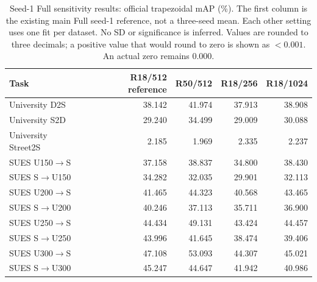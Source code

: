 \begin{table}[!t]
\centering
\caption{Seed-1 Full sensitivity results: official trapezoidal mAP (\%). The first column is the existing main Full seed-1 reference, not a three-seed mean. Each other setting uses one fit per dataset. No SD or significance is inferred. Values are rounded to three decimals; a positive value that would round to zero is shown as $<0.001$. An actual zero remains 0.000.}
\label{tab:sensitivity-map}
\small
\setlength{\tabcolsep}{3pt}
\begin{tabular}{lrrrr}
\toprule
Task & R18/512 reference & R50/512 & R18/256 & R18/1024 \\
\midrule
University D2S & 38.142 & 41.974 & 37.913 & 38.908 \\
University S2D & 29.240 & 34.499 & 29.009 & 30.088 \\
University Street2S & 2.185 & 1.969 & 2.335 & 2.237 \\
\midrule
SUES U150$\to$S & 37.158 & 38.837 & 34.800 & 38.430 \\
SUES S$\to$U150 & 34.282 & 32.035 & 29.901 & 32.113 \\
SUES U200$\to$S & 41.465 & 44.323 & 40.568 & 43.465 \\
SUES S$\to$U200 & 40.246 & 37.113 & 35.711 & 36.900 \\
SUES U250$\to$S & 44.434 & 49.131 & 43.424 & 44.457 \\
SUES S$\to$U250 & 43.996 & 41.645 & 38.474 & 39.406 \\
SUES U300$\to$S & 47.108 & 53.093 & 44.307 & 45.021 \\
SUES S$\to$U300 & 45.247 & 44.647 & 41.942 & 40.986 \\
\bottomrule
\end{tabular}
\end{table}
